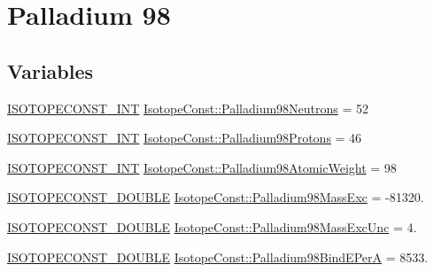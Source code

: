 \hypertarget{group___isotope_const-_palladium-_pd98}{}\section{Palladium 98}
\label{group___isotope_const-_palladium-_pd98}
\subsection*{Variables}
\begin{DoxyCompactItemize}
\item 
\mbox{\hyperlink{group___isotope_const-_macros_ga5f18360b3e99483a35c32d789e62621c}{I\+S\+O\+T\+O\+P\+E\+C\+O\+N\+S\+T\+\_\+\+I\+NT}} \mbox{\hyperlink{group___isotope_const-_palladium-_pd98_gae478dfebadc5bc7a92f364ad1653642c}{Isotope\+Const\+::\+Palladium98\+Neutrons}} = 52
\item 
\mbox{\hyperlink{group___isotope_const-_macros_ga5f18360b3e99483a35c32d789e62621c}{I\+S\+O\+T\+O\+P\+E\+C\+O\+N\+S\+T\+\_\+\+I\+NT}} \mbox{\hyperlink{group___isotope_const-_palladium-_pd98_gaad335d901e080709e66834155600d7ea}{Isotope\+Const\+::\+Palladium98\+Protons}} = 46
\item 
\mbox{\hyperlink{group___isotope_const-_macros_ga5f18360b3e99483a35c32d789e62621c}{I\+S\+O\+T\+O\+P\+E\+C\+O\+N\+S\+T\+\_\+\+I\+NT}} \mbox{\hyperlink{group___isotope_const-_palladium-_pd98_ga71953194eb5ad03d4f0fea3dfb26d5f1}{Isotope\+Const\+::\+Palladium98\+Atomic\+Weight}} = 98
\item 
\mbox{\hyperlink{group___isotope_const-_macros_ga8f45a7272ce02c0b4c65c44636ed719a}{I\+S\+O\+T\+O\+P\+E\+C\+O\+N\+S\+T\+\_\+\+D\+O\+U\+B\+LE}} \mbox{\hyperlink{group___isotope_const-_palladium-_pd98_ga06031ef6b580f1cc760df510068f5b30}{Isotope\+Const\+::\+Palladium98\+Mass\+Exc}} = -\/81320.
\item 
\mbox{\hyperlink{group___isotope_const-_macros_ga8f45a7272ce02c0b4c65c44636ed719a}{I\+S\+O\+T\+O\+P\+E\+C\+O\+N\+S\+T\+\_\+\+D\+O\+U\+B\+LE}} \mbox{\hyperlink{group___isotope_const-_palladium-_pd98_ga95c08741ac60216d4d2558cc27c761b6}{Isotope\+Const\+::\+Palladium98\+Mass\+Exc\+Unc}} = 4.
\item 
\mbox{\hyperlink{group___isotope_const-_macros_ga8f45a7272ce02c0b4c65c44636ed719a}{I\+S\+O\+T\+O\+P\+E\+C\+O\+N\+S\+T\+\_\+\+D\+O\+U\+B\+LE}} \mbox{\hyperlink{group___isotope_const-_palladium-_pd98_ga1530c6e2c924ddf31cf7ed059014abc9}{Isotope\+Const\+::\+Palladium98\+Bind\+E\+PerA}} = 8533.
\item 

\end{DoxyCompactItemize}

